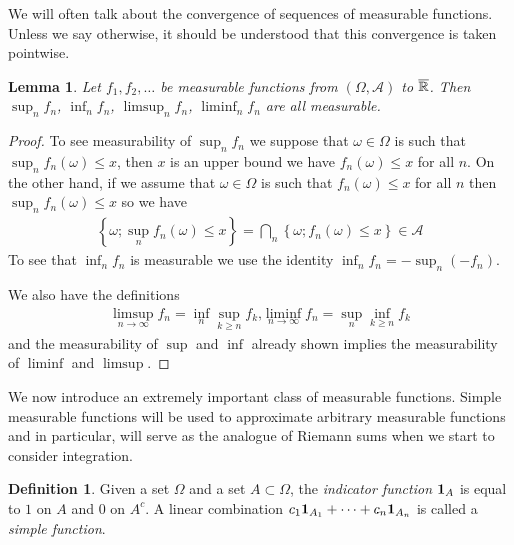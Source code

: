 \documentclass{amsart}
\newtheorem{lem}[thm]{Lemma}
\theoremstyle{remark}
\theoremstyle{definition}
\newtheorem{defn}[thm]{Definition}
\begin{document}
We will often talk about the
convergence of sequences of measurable functions.  Unless we say
otherwise, it should be understood that this convergence is taken pointwise.
\begin{lem}\label{LimitsOfMeasurable}Let $f_1, f_2, \dots$ be measurable functions from
  $(\Omega, \mathcal{A})$ to $\overline{\mathbb{R}}$.  Then $\sup_n f_n$,
  $\inf_n f_n$, $\limsup_n f_n$, $\liminf_n f_n$ are all measurable.
\end{lem}
\begin{proof}
To see measurability of $\sup_n f_n$ we suppose that $\omega \in
\Omega$ is such that $\sup_n f_n(\omega) \leq x$, then $x$ is an upper
bound we have $f_n(\omega) \leq x$ for all $n$.  On the other hand, if
we assume that $\omega \in \Omega$ is such that $f_n(\omega) \leq x$
for all $n$ then  $\sup_n f_n(\omega) \leq x$ so we have
\begin{align*}
\left \{\omega ; \sup_n f_n(\omega) \leq x \right \} = \bigcap_n \left
  \{\omega ; f_n(\omega) \leq x \right \} \in \mathcal{A}
\end{align*}
To see that $\inf_n f_n$ is measurable we use the identity $\inf_n f_n
= -\sup_n (-f_n)$.

We also have the definitions
\begin{align*}
\limsup_{n\to \infty} f_n = \inf_n \sup_{k \geq n} f_k \textrm{,} \liminf_{n\to \infty} f_n = \sup_n \inf_{k \geq n} f_k
\end{align*}
and the measurability of $\sup$ and $\inf$ already shown implies the
measurability of $\liminf$ and $\limsup$.
\end{proof}

We now introduce an extremely important class of measurable
functions.  Simple measurable functions will be used to approximate
arbitrary measurable functions and in particular, will serve as the
analogue of Riemann sums when we start to consider integration.

\begin{defn}Given a set $\Omega$ and a set $A
  \subset \Omega$, the \emph{indicator function} $\textbf{1}_{A}$ is
  equal to $1$ on $A$ and $0$ on $A^c$.  A linear combination $c_1
  \textbf{1}_{A_1} + \cdots + c_n \textbf{1}_{A_n}$ is called
  a \emph{simple function}.
\end{defn}
\end{document}
